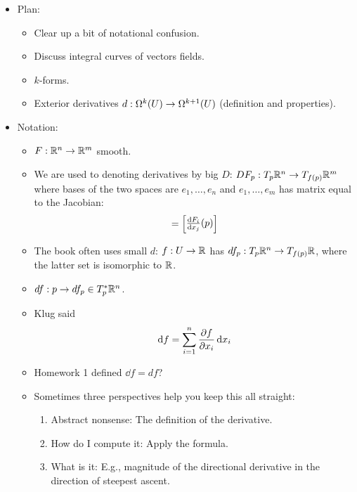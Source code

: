 \documentclass[../notes.tex]{subfiles}
\begin{document}
\begin{itemize}
\begin{enumerate}
    \end{enumerate}
    \item {}Plan:
    \begin{itemize}
        \item Clear up a bit of notational confusion.
        \item Discuss integral curves of vectors fields.
        \item $k$-forms.
        \item Exterior derivatives $d:\ome[k]{U}\to\ome[k+1]{U}$ (definition and properties).
    \end{itemize}
    \item Notation:
    \begin{itemize}
        \item $F:\R^n\to\R^m$ smooth.
        \item We are used to denoting derivatives by big $D$: $DF_p:T_p\R^n\to T_{f(p)}\R^m$ where bases of the two spaces are $e_1,\dots,e_n$ and $e_1,\dots,e_m$ has matrix equal to the Jacobian:
        \begin{equation*}
            [DF_p] =
            \begin{bmatrix}
                {\dv{F_i}{x_j}}(p)
            \end{bmatrix}
        \end{equation*}
        \item The book often uses small $d$: $f:U\to\R$ has $df_p:T_p\R^n\to T_{f(p)}\R$, where the latter set is isomorphic to $\R$.
        \item $df:p\to df_p\in T_p^*\R^n$.
        \item Klug said
        \begin{equation*}
            \dd{f} = \sum_{i=1}^n\pdv{f}{x_i}\dd{x_i}
        \end{equation*}
        \item Homework 1 defined $\dd{f}=df$?
        \item Sometimes three perspectives help you keep this all straight:
        \begin{enumerate}
            \item Abstract nonsense: The definition of the derivative.
            \item How do I compute it: Apply the formula.
            \item What is it: E.g., magnitude of the directional derivative in the direction of steepest ascent.
        \end{enumerate}
    \end{itemize}

\end{itemize}
\end{document}
